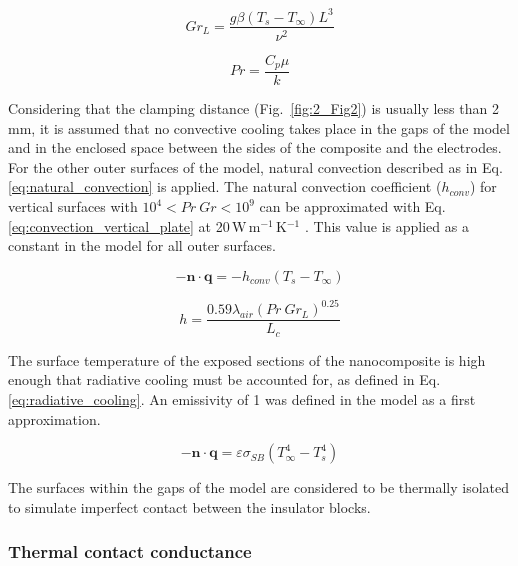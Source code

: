 \begin{equation}
Gr_L = \frac{g \beta \left( T_s - T_{\infty} \right) L^3}{\nu^2}
\label{eq:grashof_number}
\end{equation}

\begin{equation}
Pr = \frac{C_p \mu}{k}
\label{eq:prandtl_number}
\end{equation}

Considering that the clamping distance (Fig.~\ref{fig:2_Fig2}) is usually less than \mbox{2\,mm}, it is assumed that no convective cooling takes place in the gaps of the model and in the enclosed space between the sides of the composite and the electrodes. 
For the other outer surfaces of the model, natural convection described as in Eq. \ref{eq:natural_convection} is applied. 
The natural convection coefficient ($h_{conv}$) for vertical surfaces with $10^4 < Pr \ Gr < 10^9$ can be approximated with Eq. \ref{eq:convection_vertical_plate} at \mbox{20\,W\,m$^{-1}$\,K$^{-1}$} \cite{Incropera2007}.
This value is applied as a constant in the model for all outer surfaces. 

\begin{equation}
-\mathbf{n} \cdot \mathbf{q} = -h_{conv} \left( T_s -T_{\infty} \right)
\label{eq:natural_convection}
\end{equation}

\begin{equation}
h = \frac{0.59 \lambda_{air} \left(Pr \ Gr_L\right)^{0.25}}{L_c}
\label{eq:convection_vertical_plate}
\end{equation}

The surface temperature of the exposed sections of the nanocomposite is high enough that radiative cooling must be accounted for, as defined in Eq. \ref{eq:radiative_cooling}.
An emissivity of 1 was defined in the model as a first approximation. 

\begin{equation}
- \mathbf{n} \cdot \mathbf{q} = \varepsilon \sigma_{SB} \left( T_{\infty}^4 - T_s^4 \right) 
\label{eq:radiative_cooling}
\end{equation}

The surfaces within the gaps of the model are considered to be thermally isolated to simulate imperfect contact between the insulator blocks.

\subsubsection{Thermal contact conductance}

